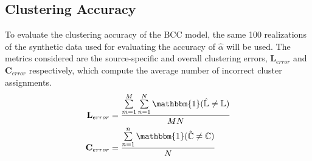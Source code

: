 \subsection{Clustering Accuracy} \label{integr-synth-cluster-sect}
To evaluate the clustering accuracy of the BCC model, the same 100 realizations of the synthetic data used for evaluating the accuracy of $\hat{\alpha}$ will be used. The metrics considered are the source-specific and overall clustering errors, $\mathbf{L}_{error}$ and $\mathbf{C}_{error}$ respectively, which compute the average number of incorrect cluster assignments. 
\begin{equation}
  \begin{aligned}
  	\mathbf{L}_{error} & = \frac{\sum\limits_{m=1}^{M}\sum\limits_{n=1}^{N}\mathbbm{1}(\hat{\mathbb{L}} \neq \mathbb{L})}{MN} \\
  	\mathbf{C}_{error} & = \frac{\sum\limits_{n=1}^{n}\mathbbm{1}(\hat{\mathbb{C}} \neq \mathbb{C})}{N}
  \end{aligned}
\end{equation}